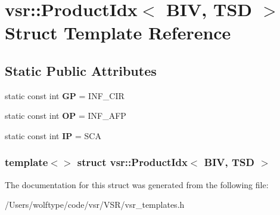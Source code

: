 \hypertarget{structvsr_1_1_product_idx_3_01_b_i_v_00_01_t_s_d_01_4}{\section{vsr\-:\-:Product\-Idx$<$ B\-I\-V, T\-S\-D $>$ Struct Template Reference}
\label{structvsr_1_1_product_idx_3_01_b_i_v_00_01_t_s_d_01_4}
}
\subsection*{Static Public Attributes}
\begin{DoxyCompactItemize}
\item 
\hypertarget{structvsr_1_1_product_idx_3_01_b_i_v_00_01_t_s_d_01_4_a3659a0855fd9982de9b42e3a39ae8e09}{static const int {\bfseries G\-P} = I\-N\-F\-\_\-\-C\-I\-R}\label{structvsr_1_1_product_idx_3_01_b_i_v_00_01_t_s_d_01_4_a3659a0855fd9982de9b42e3a39ae8e09}

\item 
\hypertarget{structvsr_1_1_product_idx_3_01_b_i_v_00_01_t_s_d_01_4_aaedfb4880b88ee7ff9e8522bcceaf078}{static const int {\bfseries O\-P} = I\-N\-F\-\_\-\-A\-F\-P}\label{structvsr_1_1_product_idx_3_01_b_i_v_00_01_t_s_d_01_4_aaedfb4880b88ee7ff9e8522bcceaf078}

\item 
\hypertarget{structvsr_1_1_product_idx_3_01_b_i_v_00_01_t_s_d_01_4_a7ce04c30ac5f632fd172b68dfcc5526d}{static const int {\bfseries I\-P} = S\-C\-A}\label{structvsr_1_1_product_idx_3_01_b_i_v_00_01_t_s_d_01_4_a7ce04c30ac5f632fd172b68dfcc5526d}

\end{DoxyCompactItemize}
\subsubsection*{template$<$$>$ struct vsr\-::\-Product\-Idx$<$ B\-I\-V, T\-S\-D $>$}



The documentation for this struct was generated from the following file\-:\begin{DoxyCompactItemize}
\item 
/\-Users/wolftype/code/vsr/\-V\-S\-R/vsr\-\_\-templates.\-h\end{DoxyCompactItemize}
